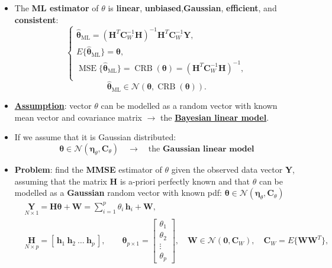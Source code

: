 \begin{itemize}
\item The \textbf{ML estimator} of \(\theta\) is \textbf{linear}, \textbf{unbiased},\textbf{Gaussian}, \textbf{efficient}, and \textbf{consistent}:
\[
\begin{cases}
\hat{\boldsymbol{\theta}}_{\text{ML}}
= \left(\mathbf{H}^{T}\mathbf{C}_W^{-1}\mathbf{H}\right)^{-1}
    \mathbf{H}^{T}\mathbf{C}_W^{-1}\mathbf{Y}, \\[6pt]
E\{\hat{\boldsymbol{\theta}}_{\text{ML}}\}
= \boldsymbol{\theta}, \\[6pt]
\operatorname{MSE}\{\hat{\boldsymbol{\theta}}_{\text{ML}}\}
= \operatorname{CRB}(\boldsymbol{\theta})
 = \left(\mathbf{H}^{T}\mathbf{C}_W^{-1}\mathbf{H}\right)^{-1}, \\[6pt]
\end{cases}\]
\vspace{-0.5em}
\[
\hat{\boldsymbol{\theta}}_{\text{ML}}
\in \mathcal{N}\!\left(\boldsymbol{\theta},\operatorname{CRB}(\boldsymbol{\theta})\right).
\]
\item \underline{\textbf{Assumption}}: vector \(\theta\) can be modelled as a random vector with known mean vector and covariance matrix \(\rightarrow\) the \underline{\textbf{Bayesian linear model}}.
\item If we assume that it is Gaussian distributed: 
\[
\boldsymbol{\theta}\in\mathcal{N}(\boldsymbol{\eta}_{\theta},\textbf{C}_{\theta})\quad\rightarrow\quad \text{the }\textbf{Gaussian linear model}
\]
\item \textbf{Problem}: find the \textbf{MMSE} estimator of \(\theta\) given the observed data vector \textbf{Y}, assuming that the matrix \textbf{H} is a-priori perfectly known and that \(\theta\) can be modelled as a \textbf{Gaussian} random vector with known pdf: \(\boldsymbol{\theta}\in\mathcal{N}(\boldsymbol{\eta}_{\theta},\mathbf{C}_{\theta})\)
\begin{align*}
&\underset{N\times 1}{\mathbf{Y}}
= \mathbf{H}\boldsymbol{\theta} + \mathbf{W}
 = \sum_{i=1}^{p}\theta_i\,\mathbf{h}_i + \mathbf{W}, \\[6pt]
&\underset{N\times p}{\mathbf{H}}
= [\,\mathbf{h}_1\ \mathbf{h}_2\ \dots\ \mathbf{h}_p\,], \qquad
\boldsymbol{\theta}_{p\times 1}
 = \begin{bmatrix}\theta_1 \\ \theta_2 \\ \vdots \\ \theta_p\end{bmatrix},\quad\mathbf{W} \in \mathcal{N}(\mathbf{0},\mathbf{C}_W),
\quad
\mathbf{C}_W = E\{\mathbf{W}\mathbf{W}^{T}\}, \\[8pt]

\end{align*}
\end{itemize}
